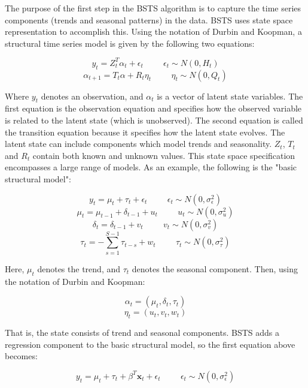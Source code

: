 \documentclass[11pt, oneside]{book}   	%
\begin{document}
The purpose of the first step in the BSTS algorithm is to capture the time series components (trends and seasonal patterns) in the data. BSTS uses state space representation to accomplish this. Using the notation of Durbin and Koopman, a structural time series model is given by the following two equations:

$$y_{t} = Z_{t}^{T}\alpha_{t}+\epsilon_{t} \hspace{1cm}         \epsilon_{t} \sim N(0, H_{t})$$
$$\alpha_{t+1} = T_{t}\alpha +R_{t}\eta_{t} \hspace{1cm}   \eta_{t} \sim N(0, Q_{t})$$


Where $y_{t}$ denotes an observation, and $\alpha_{t}$ is a vector of latent state variables. The first equation is the observation equation and specifies how the observed variable is related to the latent state (which is unobserved). The second equation is called the transition equation because it specifies how the latent state evolves. The latent state can include components which model trends and seasonality.  $Z_{t}$, $T_{t}$ and $R_{t}$ contain both known and unknown values. This state space specification encompasses a large range of models. As an example, the following is the "basic structural model": 

$$y_{t} = \mu_{t} + \tau_{t} + \epsilon_{t} \hspace{1cm}         \epsilon_{t} \sim N(0, \sigma_{\epsilon}^{2})$$
$$\mu_{t} = \mu_{t-1} + \delta_{t-1} + u_{t} \hspace{1cm}         u_{t} \sim N(0, \sigma_{u}^{2})$$
$$\delta_{t} = \delta_{t-1} + v_{t}  \hspace{1cm}         v_{t} \sim N(0, \sigma_{v}^{2})$$
$$ \tau_{t} = - \sum_{s=1}^{S-1}\tau_{t-s}+w_{t} \hspace{1cm}         \tau_{t} \sim N(0, \sigma_{\tau}^{2})$$

Here, $\mu_{t}$ denotes the trend, and $\tau_{t}$ denotes the seasonal component. Then, using the notation of Durbin and Koopman:

$$\alpha_{t} =  (\mu_{t}, \delta_{t}, \tau_{t})$$
$$ \eta_{t} = (u_{t}, v_{t}, w_{t})$$

That is, the state consists of trend and seasonal components. BSTS adds a regression component to the basic structural model, so the first equation above becomes:

$$y_{t} = \mu_{t} + \tau_{t} + \beta^{T}\textbf{x}_{t} + \epsilon_{t} \hspace{1cm}         \epsilon_{t} \sim N(0, \sigma_{\epsilon}^{2})$$
\end{document}
